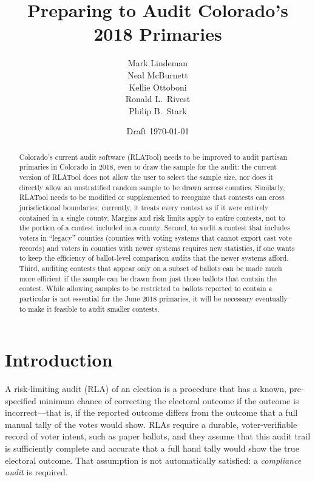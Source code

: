 \documentclass[12pt]{article}
\title{Preparing to Audit Colorado's 2018 Primaries}
\author{
   Mark Lindeman\\
   Neal McBurnett\\
   Kellie Ottoboni\\
   Ronald L.~Rivest\\
   Philip B.~Stark
}
\date{Draft \today}
\begin{document}
\maketitle


\begin{abstract}
Colorado's current audit software (RLATool) needs to be improved to audit partisan 
primaries in Colorado in 2018, even to draw the sample for the audit:
the current version of RLATool does not allow the user to select the sample size, nor does
it directly allow an unstratified random sample to be drawn across counties.
Similarly, RLATool needs to be modified 
or supplemented %
to recognize that contests can cross jurisdictional
boundaries; currently, it treats every contest as if it were entirely
contained in a single county.
Margins and risk limits apply to entire contests, not to the portion of a contest
included in a county.
Second, to audit a contest that includes voters in ``legacy'' counties 
(counties with voting systems that cannot export cast vote records) 
and voters in counties with newer systems requires new statistics, if one wants to
keep the efficiency of ballot-level comparison audits that the newer systems
afford.
Third, auditing contests that appear only on a subset of ballots can
be made much more efficient if the sample can be drawn from just those ballots
that contain the contest.
While allowing samples to be restricted to ballots reported to contain a particular
is not essential for the June 2018 primaries, it will be necessary
eventually to make it feasible to audit smaller contests.
\end{abstract}

\section{Introduction}
A risk-limiting audit (RLA) of an election is a procedure that
has a known, pre-specified minimum chance of correcting the electoral outcome if the outcome
is incorrect---that is, if the reported outcome differs from the outcome that a full manual
tally of the votes would show. 
RLAs require a durable, voter-verifiable record of voter intent, such as paper ballots,
and they assume that this audit trail is sufficiently complete and accurate that a full hand
tally would show the true electoral outcome.
That assumption is not automatically satisfied: a \emph{compliance audit} is required.
\end{document}
